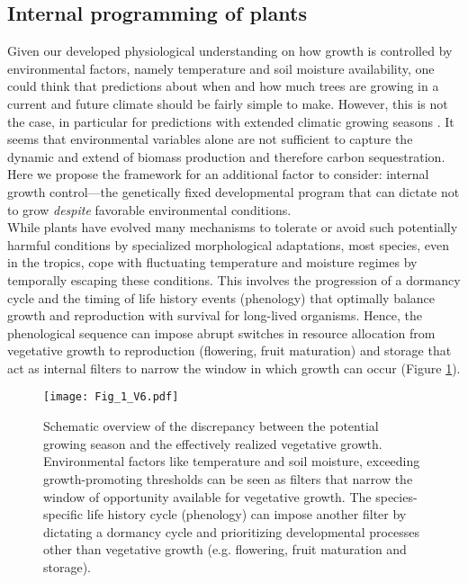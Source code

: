 \documentclass{article}
\begin{document}
		\subsection*{Internal programming of plants}
		Given our developed physiological understanding on how growth is controlled by environmental factors, namely temperature and soil moisture availability, one could think that predictions about when and how much trees are growing in a current and future climate should be fairly simple to make. However, this is not the case, in particular for predictions with extended climatic growing seasons \citep{zohnerHowChangesSpring2021}. It seems that environmental variables alone are not sufficient to capture the dynamic and extend of biomass production and therefore carbon sequestration.  Here we propose the framework for an additional factor to consider: internal growth control---the genetically fixed developmental program that can dictate not to grow \textit{despite} favorable environmental conditions.\\
		
		While plants have evolved many mechanisms to tolerate or avoid such potentially harmful conditions by specialized morphological adaptations, most species, even in the tropics, cope with fluctuating temperature and moisture regimes by temporally escaping these conditions. This involves the progression of a dormancy cycle and the timing of life history events (phenology) that optimally balance growth and reproduction with survival for long-lived organisms. Hence, the phenological sequence can impose abrupt switches in resource allocation from vegetative growth to reproduction (flowering, fruit maturation) and storage \citep{stearnsTradeOffsLifeHistoryEvolution1989} that act as internal filters to narrow the window in which growth can occur (Figure \ref{fig:fig_1xxx}).\\
			
		
								\begin{figure}
								\centering
								\texttt{[image: Fig\_1\_V6.pdf]} 
								\caption{Schematic overview of the discrepancy between the potential growing season and the effectively realized vegetative growth. Environmental factors like temperature and soil moisture, exceeding growth-promoting thresholds can be seen as filters that narrow the window of opportunity available for vegetative growth. The species-specific life history cycle (phenology) can impose another filter by dictating a dormancy cycle and prioritizing developmental processes other than vegetative growth (e.g. flowering, fruit maturation and storage). }
								\label{fig:fig_1xxx}
							\end{figure}
\end{document}
